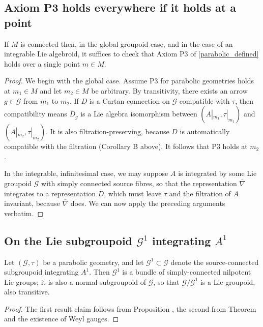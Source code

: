 \documentclass[leqno,12pt]{amsart} %
\begin{document}
\subsection{Axiom P3 holds everywhere if it holds at a point}\label{parabolic}

\begin{proposition}
  If $M$ is connected then, in the global groupoid case, and in the case of an integrable
  Lie algebroid, it suffices to check that Axiom P3 of \ref{parabolic_defined} holds over
  a single point $m \in M$.
\end{proposition}

\begin{proof}
  We begin with the global case. Assume P3 for parabolic geometries holds at $m_1 \in M$
  and let $m_2 \in M$ be arbitrary. By transitivity, there exists an arrow
  $g \in {\mathcal G} $ from $m_1$ to $m_2$. If $D$ is a Cartan connection on
  ${\mathcal G} $ compatible with $\tau $, then compatibility means $\bar D_g$ is a Lie
  algebra isomorphism between $(A|_{m_1}, \tau|_{m_1})$ and $(A|_{m_2}, \tau|_{m_2})$. It
  is also filtration-preserving, because $D$ is automatically compatible with the
  filtration (Corollary B above). It follows that P3 holds at $m_2$.

  In the integrable, infinitesimal case, we may suppose $A$ is integrated by some Lie
  groupoid ${\mathcal G} $ with simply connected source fibres, so that the representation
  $\bar\nabla $ integrates to a representation $\bar D$, which must leave $\tau $ and the
  filtration of $A$ invariant, because $\bar\nabla $ does. We can now apply the preceding
  arguments verbatim.
\end{proof}

\subsection{On the Lie subgroupoid ${\mathcal G}^1$ integrating $A^1$}\label{subgroups}

\begin{proposition}
  Let $({\mathcal G}, \tau)$ be a parabolic geometry, and let
  ${\mathcal G}^1 \subset {\mathcal G} $ denote the source-connected subgroupoid
  integrating $A^1$.  Then ${\mathcal G}^1 $ is a bundle of simply-connected nilpotent Lie
  groups; it is also a normal subgroupoid of ${\mathcal G}$, so that
  ${\mathcal G}/{\mathcal G}^1$ is a Lie groupoid, also transitive.
\end{proposition}
\begin{proof}
  The first result claim follows from Proposition , the second from
  Theorem  and the existence of Weyl gauges.
\end{proof}
\end{document}
